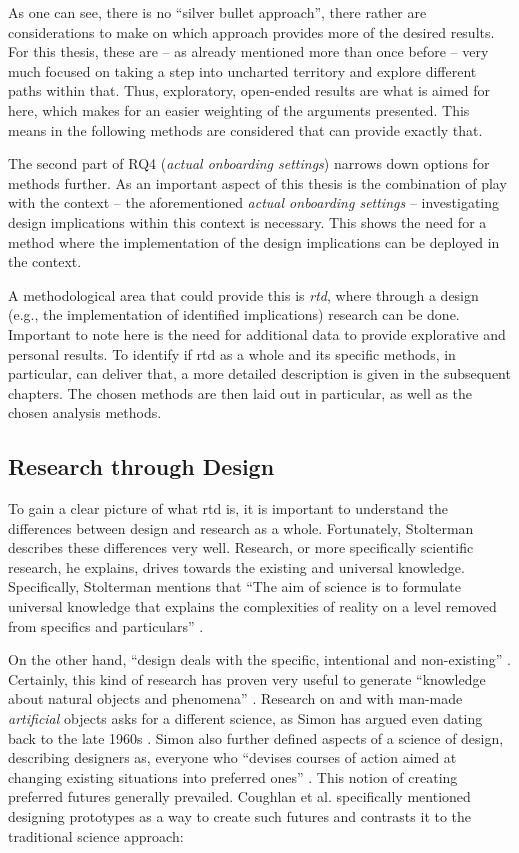 As one can see, there is no \enquote{silver bullet approach}, there rather are considerations to make on which approach provides more of the desired results. For this thesis, these are -- as already mentioned more than once before -- very much focused on taking a step into uncharted territory and explore different paths within that. Thus, exploratory, open-ended results are what is aimed for here, which makes for an easier weighting of the arguments presented. This means in the following methods are considered that can provide exactly that.

The second part of RQ4 (\textit{actual onboarding settings}) narrows down options for methods further. As an important aspect of this thesis is the combination of play with the context -- the aforementioned \textit{actual onboarding settings} -- investigating design implications within this context is necessary. This shows the need for a method where the implementation of the design implications can be deployed in the context.

A methodological area that could provide this is \textit{\gls{rtd}}, where through a design (e.g., the implementation of identified implications) research can be done. Important to note here is the need for additional data to provide explorative and personal results. To identify if \gls{rtd} as a whole and its specific methods, in particular, can deliver that, a more detailed description is given in the subsequent chapters. The chosen methods are then laid out in particular, as well as the chosen analysis methods.

\subsection{Research through Design}

To gain a clear picture of what \gls{rtd} is, it is important to understand the differences between design and research as a whole. Fortunately, Stolterman describes these differences very well. Research, or more specifically scientific research, he explains, drives towards the existing and universal knowledge. Specifically, Stolterman mentions that \enquote{The aim of science is to formulate universal knowledge that explains the complexities of reality on a level removed from specifics and particulars} \cite[p. 57]{stolterman2008nature}.

On the other hand, \enquote{design deals with the specific, intentional and non-existing} \cite[p. 59]{stolterman2008nature}. Certainly, this kind of research has proven very useful to generate \enquote{knowledge about natural objects and phenomena} \cite[p. 3]{simon2019sciences}. Research on and with man-made \textit{artificial} objects asks for a different science, as Simon has argued even dating back to the late 1960s \cite{simon2019sciences}. Simon also further defined aspects of a science of design, describing designers as, everyone who \enquote{devises courses of action aimed at changing existing situations into preferred ones} \cite[p. 111]{simon2019sciences}. This notion of creating preferred futures generally prevailed. Coughlan et al. specifically mentioned designing prototypes as a way to create such futures and contrasts it to the traditional science approach:

